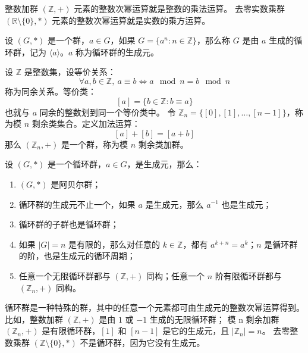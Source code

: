 \begin{note}
    整数加群 $(\mathbb{Z}, +)$ 元素的整数次幂运算就是整数的乘法运算。
    去零实数乘群 $(\mathbb{R}\setminus\{0\}, *)$ 元素的整数次幂运算就是实数的乘方运算。
\end{note}
\vspace{1em}

\begin{definition}
    设 $(G, *)$ 是一个群，$a\in G$，如果 $G = \{a^n : n\in\mathbb{Z}\}$，那么称 $G$ 是由 $a$ 生成的循环群，记为 $\langle a \rangle$。$a$ 称为循环群的生成元。
    \label{def:cyclic_group}
\end{definition}

\begin{definition}[模 n 剩余类加群]
    设 $\mathbb{Z}$ 是整数集，设等价关系：
    \[
        \forall a,b \in \mathbb{Z},\ a\equiv b \iff a \mod n = b \mod n
    \]
    称为同余关系。等价类：
    \[
        [a] = \{b\in\mathbb{Z} : b \equiv a\}
    \]
    也就与 $a$ 同余的整数划到同一个等价类中。
    令 $\mathbb{Z}_n = \{[0],[1],\ldots,[n-1]\}$，称为模 $n$ 剩余类集合。定义加法运算：
    \[
        [a] + [b] = [a + b]
    \]
    那么 $(\mathbb{Z}_n, +)$ 是一个群，称为模 $n$ 剩余类加群。
\end{definition}

\begin{proposition}[循环群的性质]
    设 $(G, *)$ 是一个循环群，$a\in G$，是生成元，那么：
    \begin{enumerate}
        \item $(G, *)$ 是阿贝尔群；
        \item 循环群的生成元不止一个，如果 $a$ 是生成元，那么 $a^{-1}$ 也是生成元；
        \item 循环群的子群也是循环群；
        \item 如果 $|G| = n$ 是有限的，那么对任意的 $k\in\mathbb{Z}$，都有 $a^{k+n} = a^k$；$n$ 是循环群的阶，也是生成元的循环周期；
        \item 任意一个无限循环群都与 $(\mathbb{Z}, +)$ 同构；任意一个 $n$ 阶有限循环群都与 $(\mathbb{Z}_n, +)$ 同构。
    \end{enumerate}
\end{proposition}

\begin{note}
    循环群是一种特殊的群，其中的任意一个元素都可由生成元的整数次幂运算得到。比如，整数加群 $(\mathbb{Z}, +)$ 是由 $1$ 或 $-1$ 生成的无限循环群；
    模 n 剩余加群 $(\mathbb{Z}_n,+)$ 是有限循环群，$[1]$ 和 $[n-1]$ 是它的生成元，且 $|\mathbb{Z}_n| = n$。
    去零整数乘群 $(\mathbb{Z}\setminus\{0\}, *)$ 不是循环群，因为它没有生成元。
\end{note}
\vspace{1em}

